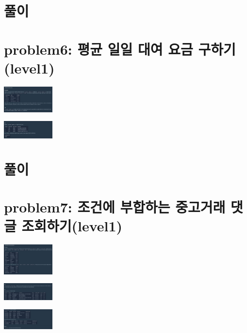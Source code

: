 \documentclass[11pt]{article}
\begin{document}
\section*{풀이}
\label{sec:org430372a}

\section*{problem6: 평균 일일 대여 요금 구하기(level1)}
\label{sec:orga35d34d}
\begin{center}
\includegraphics[width=100px]{../static/img/sql/p6-1.png}
\end{center}
\begin{center}
\includegraphics[width=100px]{../static/img/sql/p6-2.png}
\end{center}

\section*{풀이}
\label{sec:org6d1b71b}

\section*{problem7: 조건에 부합하는 중고거래 댓글 조회하기(level1)}
\label{sec:orgd2c4c08}
\begin{center}
\includegraphics[width=100px]{../static/img/sql/p7-1.png}
\end{center}
\begin{center}
\includegraphics[width=100px]{../static/img/sql/p7-2.png}
\end{center}
\begin{center}
\includegraphics[width=100px]{../static/img/sql/p7-3.png}
\end{center}
\end{document}
